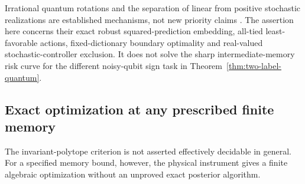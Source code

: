 Irrational quantum rotations and the separation of linear from positive stochastic realizations are established mechanisms, not new priority claims \cite{Heller65,CarlylePaz71}. The assertion here concerns their exact robust squared-prediction embedding, all-tied least-favorable actions, fixed-dictionary boundary optimality and real-valued stochastic-controller exclusion. It does not solve the sharp intermediate-memory risk curve for the different noisy-qubit sign task in Theorem~\ref{thm:two-label-quantum}.

\subsection{Exact optimization at any prescribed finite memory}
The invariant-polytope criterion is not asserted effectively decidable in general. For a specified memory bound, however, the physical instrument gives a finite algebraic optimization without an unproved exact posterior algorithm.

